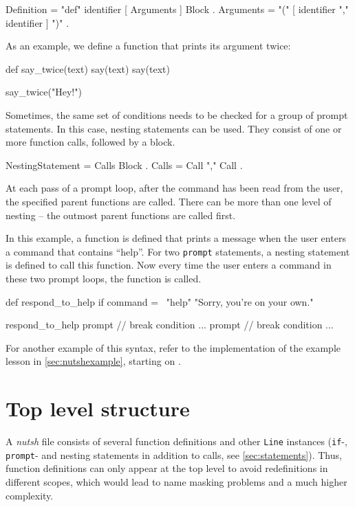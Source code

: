 \documentclass[paper=a4,twoside,abstract=on,cleardoublepage=empty,numbers=noenddot,toc=bib,12pt,appendixprefix=true]{scrreprt}
\begin{document}
\begin{ebnf}
Definition = "def" identifier [ Arguments ] Block .
Arguments = "(" [ identifier { "," identifier } ] ")" .
\end{ebnf}
%
As an example, we define a function that prints its argument twice:

\begin{nutsh}
def say_twice(text) {
    say(text)
    say(text)
}

say_twice("Hey!")
\end{nutsh}


Sometimes, the same set of conditions needs to be checked for a group of prompt statements. In this case, nesting statements can be used. They consist of one or more function calls, followed by a block.

\begin{ebnf}
NestingStatement = Calls Block .
Calls = Call { "," Call } .
\end{ebnf}
%
At each pass of a prompt loop, after the command has been read from the user, the specified parent functions are called. There can be more than one level of nesting -- the outmost parent functions are called first.

In this example, a function is defined that prints a message when the user enters a command that contains “help”. For two \texttt{prompt} statements, a nesting statement is defined to call this function. Now every time the user enters a command in these two prompt loops, the function is called.

\begin{nutsh}
def respond_to_help {
    if command =~ "help" {
        "Sorry, you're on your own."
    }
}

respond_to_help {
    prompt {
        // break condition ...
    }
    prompt {
        // break condition ...
    }
}
\end{nutsh}
%
For another example of this syntax, refer to the implementation of the example lesson in \cref{sec:nutshexample}, starting on .

\section{Top level structure}

A \emph{nutsh} file consists of several function definitions and other \texttt{Line} instances (\texttt{if}-, \texttt{prompt}- and nesting statements in addition to calls, see \cref{sec:statements}). Thus, function definitions can only appear at the top level to avoid redefinitions in different scopes, which would lead to name masking problems and a much higher complexity.
\end{document}
